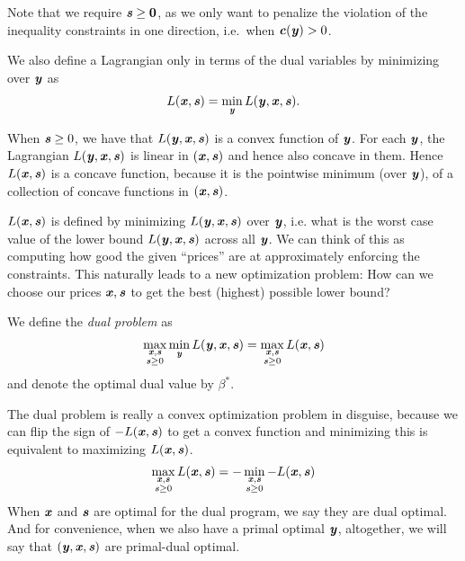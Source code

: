 {\begin{definition}
Note that we require $\ss \geq \veczero$, as we only want to penalize the violation of the inequality constraints in one direction, i.e.\ when $\cc(\yy) > 0$.


We also define a Lagrangian only in terms of the dual variables by minimizing over $\yy$ as
\begin{equation*} L(\xx, \ss) = \min_{\yy}L(\yy, \xx,
  \ss). \end{equation*}

\end{definition}
When $\ss \geq 0$, we have that $L(\yy,\xx,\ss)$ is a
convex function of $\yy$.
For each $\yy$, the Lagrangian $L(\yy, \xx,
\ss)$ is linear in $(\xx,\ss)$ and hence also concave in them.
Hence $L(\xx,  \ss)$ is a concave function, because it is the pointwise
minimum (over $\yy$), of a collection of concave functions in
$(\xx,\ss)$.


$L(\xx, \ss)$ is defined by minimizing $L(\yy,\xx,\ss)$ over $\yy$,
i.e. what is the worst case value of the lower bound $L(\yy,\xx,\ss)$
across all $\yy$.
We can think of this as computing how good the given ``prices'' are at
approximately enforcing the constraints.
This naturally leads to a new optimization problem: How can we choose
our prices $\xx, \ss$ to get the best (highest) possible lower bound?

\begin{definition}
We define the \emph{dual problem} as
\begin{align}
  \label{eq:dualprob}
  \max_{\substack{\xx, \ss \\ \ss \geq 0}}
  \min_{\yy}L(\yy, \xx, \ss)
  =
  \max_{\substack{\xx, \ss \\ \ss \geq 0}} L(\xx,  \ss)
  \end{align}
and denote the optimal dual value by $\beta^*$.
\end{definition}

The dual problem is really a convex optimization
problem in disguise, because we can flip the sign of $-L(\xx,  \ss)$
to get a convex function and minimizing this is equivalent to
maximizing $L(\xx,  \ss)$.
\begin{align*}
  \max_{\substack{\xx, \ss \\ \ss \geq 0}} L(\xx,  \ss)
  =
  -
  \min_{\substack{\xx, \ss \\ \ss \geq 0}} -L(\xx,  \ss)
\end{align*}
When $\xx$ and $\ss$ are optimal for the dual program, we
say they are dual optimal. And for convenience, when we also have a
primal optimal $\yy$, altogether, we will say that $(\yy,\xx,\ss)$ are
primal-dual optimal.

}
